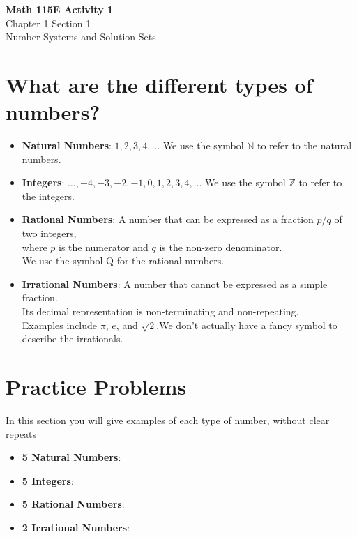 \documentclass{article}
\begin{document}
\begin{center}
    \Large \textbf{Math 115E Activity 1} \\
    \vspace{0.2cm}
    \normalsize Chapter 1 Section 1 \\
    \normalsize Number Systems and Solution Sets
\end{center}
\vspace{1cm} %

\section*{What are the different types of numbers?}
\begin{itemize}
    \item \textbf{Natural Numbers}: $1, 2, 3, 4, \ldots$ We use the
symbol $\mathbb{N}$ to refer to the natural numbers.
    
    \item \textbf{Integers}: $\ldots, -4, -3, -2, -1, 0, 1, 2, 3, 4, \ldots$ We use the symbol $\mathbb{Z}$ to refer to the integers.

    \item \textbf{Rational Numbers}: A number that can be expressed as a fraction $p/q$ of two integers, \\
    where $p$ is the numerator and $q$ is the non-zero denominator. \\
    We use the symbol Q for the rational numbers.
    
    \item \textbf{Irrational Numbers}: A number that cannot be expressed as a simple fraction. \\
    Its decimal representation is non-terminating and non-repeating. \\
    Examples include $\pi$, $e$, and $\sqrt{2}$.We don’t actually have a
    fancy symbol to describe the irrationals.

\end{itemize}

\vspace{0.5cm} %

\section*{Practice Problems}
In this section you will give examples of each type of number, without clear repeats
\begin{itemize}
    \item \textbf{5 Natural Numbers}: 
    \vspace{0.5cm}
    \item \textbf{5 Integers}: 
    \vspace{0.5cm}
    \item \textbf{5 Rational Numbers}: 
    \vspace{0.5cm}
    \item \textbf{2 Irrational Numbers}: 
    \vspace{0.5cm}
\end{itemize}
\end{document}
